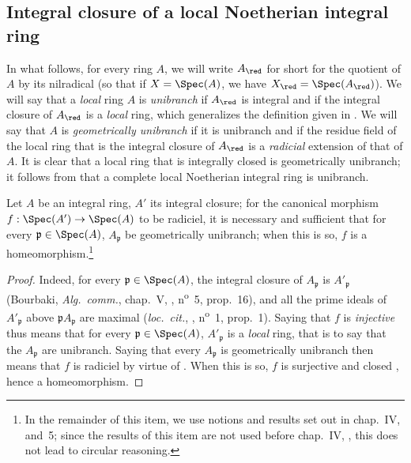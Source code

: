 \subsection{Integral closure of a local Noetherian integral ring}
\label{subsection:0.23.2}

\begin{env}[23.2.1]
\label{0.23.2.1}
In what follows, for every ring $A$, we will write $A_\red$ for short for the quotient of $A$ by its nilradical (so that if $X=\Spec(A)$, we have $X_\red=\Spec(A_\red)$).
We will say that a \emph{local} ring $A$ is \emph{unibranch} if $A_\red$ is integral and if the integral closure of $A_\red$ is a \emph{local} ring, which generalizes the definition given in .
We will say that $A$ is \emph{geometrically unibranch} if it is unibranch and if the residue field of the local ring that is the integral closure of $A_\red$ is a \emph{radicial} extension of that of $A$.
It is clear that a local ring that is integrally closed is geometrically unibranch; it follows from  that a complete local Noetherian integral ring is unibranch.
\end{env}

\begin{lemma}[23.2.2]
\label{0.23.2.2}
Let $A$ be an integral ring, $A'$ its integral closure; for the canonical morphism $f:\Spec(A')\to\Spec(A)$ to be radiciel, it is necessary and sufficient that for every $\mathfrak{p}\in\Spec(A)$, $A_\mathfrak{p}$ be geometrically unibranch; when this is so, $f$ is a homeomorphism.\footnote{In the remainder of this item, we use notions and results set out in chap.~IV, \textsection{} and~5; since the results of this item are not used before chap.~IV, , this does not lead to circular reasoning.}
\end{lemma}

\begin{proof}
Indeed, for every $\mathfrak{p}\in\Spec(A)$, the integral closure of $A_\mathfrak{p}$ is $A'_\mathfrak{p}$ (Bourbaki, \emph{Alg.~comm.}, chap.~V, , n\textsuperscript{o}~5, prop.~16), and all the prime ideals of $A'_\mathfrak{p}$ above $\mathfrak{p}A_\mathfrak{p}$ are maximal (\emph{loc.~cit.}, , n\textsuperscript{o}~1, prop.~1).
Saying that $f$ is \emph{injective} thus means that for every $\mathfrak{p}\in\Spec(A)$, $A'_\mathfrak{p}$ is a \emph{local} ring, that is to say that the $A_\mathfrak{p}$ are unibranch.
Saying that every $A_\mathfrak{p}$ is geometrically unibranch then means that $f$ is radiciel by virtue of .
When this is so, $f$ is surjective and closed , hence a homeomorphism.
\end{proof}

